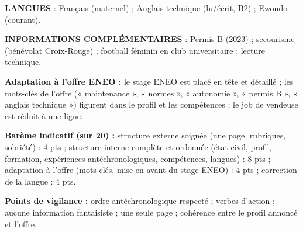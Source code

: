 \documentclass[11pt]{article}
\begin{document}
\begin{corrige}
\textbf{LANGUES} : Français (maternel) ; Anglais technique (lu/écrit, B2) ; Ewondo (courant).

\textbf{INFORMATIONS COMPLÉMENTAIRES} : Permis B (2023) ; secourisme (bénévolat Croix-Rouge) ; football féminin en club universitaire ; lecture technique.

\textbf{Adaptation à l'offre ENEO :} le stage ENEO est placé en tête et détaillé ; les mots-clés de l'offre (« maintenance », « normes », « autonomie », « permis B », « anglais technique ») figurent dans le profil et les compétences ; le job de vendeuse est réduit à une ligne.

\textbf{Barème indicatif (sur 20) :} structure externe soignée (une page, rubriques, sobriété) : 4 pts ; structure interne complète et ordonnée (état civil, profil, formation, expériences antéchronologiques, compétences, langues) : 8 pts ; adaptation à l'offre (mots-clés, mise en avant du stage ENEO) : 4 pts ; correction de la langue : 4 pts.

\textbf{Points de vigilance :} ordre antéchronologique respecté ; verbes d'action ; aucune information fantaisiste ; une seule page ; cohérence entre le profil annoncé et l'offre.
\end{corrige}
\end{document}
